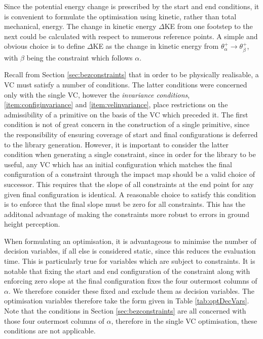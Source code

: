Since the potential energy change is prescribed by the start and end conditions, it is convenient to formulate the optimisation using kinetic, rather than total mechanical, energy. The change in kinetic energy $\Delta$KE from one footstep to the next could be calculated with respect to numerous reference points. A simple and obvious choice is to define $\Delta$KE as the change in kinetic energy from $\theta_\alpha^+ \rightarrow \theta_\beta^+$, with $\beta$ being the constraint which follows $\alpha$.

Recall from Section \ref{sec:bezconstraints} that in order to be physically realisable, a VC must satisfy a number of conditions. The latter conditions were concerned only with the single VC, however the \textit{invariance conditions}, \ref{item:configinvariance} and \ref{item:velinvariance}, place restrictions on the admissibility of a primitive on the basis of the VC which preceded it. The first condition is not of great concern in the construction of a single primitive, since the responsibility of ensuring coverage of start and final configurations is deferred to the library generation. However, it is important to consider the latter condition when generating a single constraint, since in order for the library to be useful, any VC which has an initial configuration which matches the final configuration of a constraint through the impact map should be a valid choice of successor. This requires that the slope of all constraints at the end point for any given final configuration is identical. A reasonable choice to satisfy this condition is to enforce that the final slope must be zero for all constraints. This has the additonal advantage of making the constraints more robust to errors in ground height perception.

When formulating an optimisation, it is advantageous to minimise the number of decision variables, if all else is considered static, since this reduces the evaluation time. This is particularly true for variables which are subject to constraints. It is notable that fixing the start and end configuration of the constraint along with enforcing zero slope at the final configuration fixes the four outermost columns of $\alpha$. We therefore consider these fixed and exclude them as decision variables. The optimisation variables therefore take the form given in Table \ref{tab:optDecVars}. Note that the conditions in Section \ref{sec:bezconstraints} are all concerned with those four outermost columns of $\alpha$, therefore in the single VC optimisation, these conditions are not applicable.

